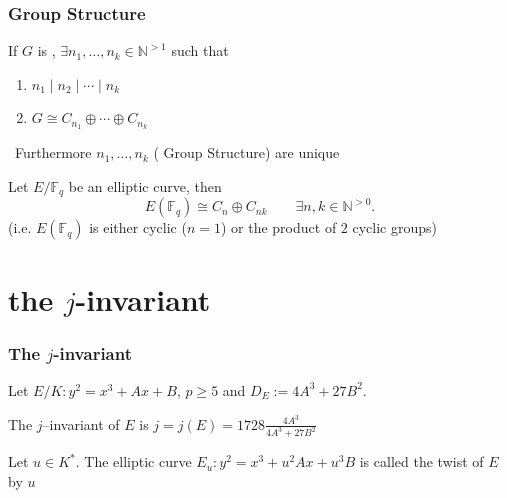 \documentclass[12pt,handout]{beamer} %
\newcommand{\N}{\mathbb N}
\newcommand{\F}{\mathbb F}
\theoremstyle{definition}
\begin{document}
\begin{frame}%
 \frametitle{Group Structure}

\begin{theorem}
 If $G$ is {\color[rgb]{0.9,0.3,0.2}{abelian and finite}},  $\exists n_1,\ldots,n_k\in\N^{>1}$ such that
 \begin{enumerate}[<+-| alert@+>]
\item $n_1\mid n_2\mid\cdots\mid n_k$
\item $G\cong C_{n_1}\oplus\cdots\oplus C_{n_k}$
\end{enumerate}
\ \hfill Furthermore $n_1,\ldots,n_k$ ({\color[rgb]{0.9,0.3,0.2} Group Structure}) are unique
 \end{theorem}\pause


\begin{theorem} Let $E/\F_q$ be 
an elliptic curve, then
$$E(\F_q)\cong C_n\oplus C_{nk}\qquad\exists n,k\in\N^{>0}.$$
(i.e. $E(\F_q)$ is either cyclic ($n=1$) or the product of $2$ cyclic groups)
\pause
\end{theorem}            
\end{frame}





\section{the \texorpdfstring{$j$}{j}-invariant}
\begin{frame}
\frametitle{The $j$-invariant}
Let  $E/K: y^2=x^3+Ax+B$, $p\ge5$ and $D_E:=4A^3+27B^2$. \pause

\begin{definition} The $j$--invariant of $E$ is
$j=j(E)=1728\frac{4A^3}{4A^3+27B^2}$
\end{definition}


  \begin{definition} Let $u\in K^*$. The elliptic curve $E_u:y^2=x^3+u^2Ax+u^3B$ is called the \alert{twist} of $E$ by $u$
\end{definition}
\end{frame}
\end{document}
